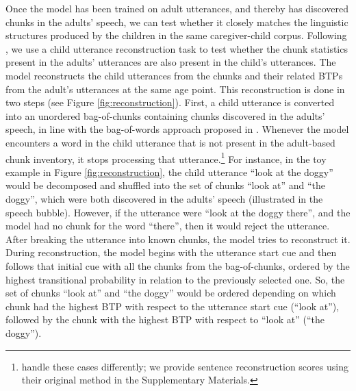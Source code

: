\documentclass{article}
\begin{document}
Once the model has been trained on adult utterances, and thereby has discovered chunks in the adults' speech, we can test whether it closely matches the linguistic structures produced by the children in the same caregiver-child corpus. Following , we use a child utterance reconstruction task to test whether the chunk statistics present in the adults' utterances are also present in the child's utterances. The model reconstructs the child utterances from the chunks and their related BTPs from the adult's utterances at the same age point. This reconstruction is done in two steps (see Figure \ref{fig:reconstruction}). First, a child utterance is converted into an unordered bag-of-chunks containing chunks discovered in the adults’ speech, in line with the bag-of-words approach proposed in . Whenever the model encounters a word in the child utterance that is not present in the adult-based chunk inventory, it stops processing that utterance.\footnote{ handle these cases differently; we provide sentence reconstruction scores using their original method in the Supplementary Materials.} For instance, in the toy example in Figure \ref{fig:reconstruction}, the child utterance ``look at the doggy'' would be decomposed and shuffled into the set of chunks ``look at'' and ``the doggy'', which were both discovered in the adults' speech (illustrated in the speech bubble). However, if the utterance were ``look at the doggy there'', and the model had no chunk for the word ``there'', then it would reject the utterance. After breaking the utterance into known chunks, the model tries to reconstruct it. During reconstruction, the model begins with the utterance start cue and then follows that initial cue with all the chunks from the bag-of-chunks, ordered by the highest transitional probability in relation to the previously selected one. So, the set of chunks ``look at'' and ``the doggy'' would be ordered depending on which chunk had the highest BTP with respect to the utterance start cue (``look at''), followed by the chunk with the highest BTP with respect to ``look at'' (``the doggy'').
\end{document}

